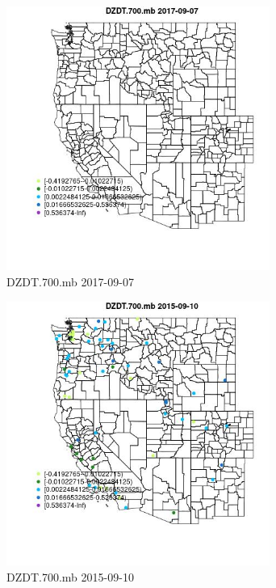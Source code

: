 \begin{figure} 
\centering  
\includegraphics[width=0.77\textwidth]{Code_Outputs/Report_ML_input_PM25_Step4_part_e_de_duplicated_aveswNAs_MapObsDZDT700mb2017-09-07.jpg} 
\caption{\label{fig:Report_ML_input_PM25_Step4_part_e_de_duplicated_aveswNAsMapObsDZDT700mb2017-09-07}DZDT.700.mb 2017-09-07} 
\end{figure} 
 

\begin{figure} 
\centering  
\includegraphics[width=0.77\textwidth]{Code_Outputs/Report_ML_input_PM25_Step4_part_e_de_duplicated_aveswNAs_MapObsDZDT700mb2015-09-10.jpg} 
\caption{\label{fig:Report_ML_input_PM25_Step4_part_e_de_duplicated_aveswNAsMapObsDZDT700mb2015-09-10}DZDT.700.mb 2015-09-10} 
\end{figure} 
 


